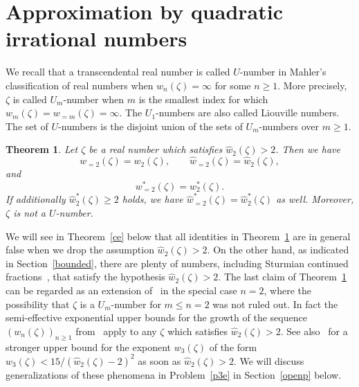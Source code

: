 \documentclass[12pt]{amsart}
\newtheorem{theorem}{Theorem}[section]
\theoremstyle{definition}
\begin{document}
\section{Approximation by quadratic irrational numbers}  \label{quadro}

We recall that a transcendental real number is called $U$-number in Mahler's classification
of real numbers when $w_{n}(\zeta)=\infty$ for
some $n\geq 1$. More precisely, $\zeta$
is called $U_{m}$-number when $m$ is the smallest index for which $w_{m}(\zeta)=w_{=m}(\zeta)=\infty$. The
$U_{1}$-numbers are also called Liouville numbers. 
The set of $U$-numbers is the disjoint union 
of the sets of $U_{m}$-numbers over $m\geq 1$.

\begin{theorem} \label{grad2}
Let $\zeta$ be a real number which satisfies $\widehat{w}_{2}(\zeta)>2$. Then we have
%
\begin{equation} \label{eq:numerouno}
w_{=2}(\zeta)= w_{2}(\zeta), \qquad \widehat{w}_{=2}(\zeta)=\widehat{w}_{2}(\zeta),
\end{equation}
%
and 
%
\begin{equation} \label{eq:numerodos}
w_{=2}^{\ast}(\zeta)= w_{2}^{\ast}(\zeta).
\end{equation}
%
If additionally $\widehat{w}_{2}^{\ast}(\zeta)\geq 2$
holds, we have $\widehat{w}_{=2}^{\ast}(\zeta)=\widehat{w}_{2}^{\ast}(\zeta)$ as well.
Moreover, $\zeta$ is not a $U$-number.
\end{theorem}

We will see in Theorem~\ref{ce} below
that all identities in Theorem~\ref{grad2} are in general false when 
we drop the assumption $\widehat{w}_{2}(\zeta)>2$.
On the other hand, as indicated in Section~\ref{bounded}, there 
are plenty of numbers, 
including Sturmian continued fractions~\cite{buglaur}, that satisfy the hypothesis $\widehat{w}_{2}(\zeta)>2$.   
The last claim of Theorem~\ref{grad2} 
can be regarded as an extension of~\cite[Th\'{e}or\`{e}me~5.3]{adambug} in the special case $n=2$, where the possibility
that $\zeta$ is a $U_{m}$-number for $m\leq n=2$ was not ruled out.
In fact
the semi-effective exponential upper bounds for the growth of the
sequence $(w_{n}(\zeta))_{n\geq 1}$
from~\cite[Th\'{e}or\`{e}me~4.2]{adambug} 
apply to any $\zeta$ which satisfies $\widehat{w}_{2}(\zeta)>2$.
See also~\cite[Corollary~4.6]{ichspec} for a stronger upper
bound for the exponent $w_{3}(\zeta)$ of the form
$w_{3}(\zeta)<15/(\widehat{w}_{2}(\zeta)-2)^{2}$ 
as soon as $\widehat{w}_{2}(\zeta)>2$.
We will discuss generalizations of these phenomena
in Problem~\ref{p3e} in Section~\ref{openp} below.
\end{document}
